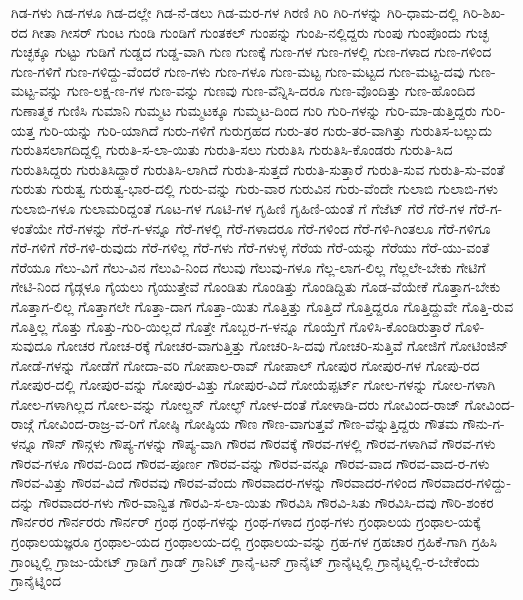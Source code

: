 {ಗಿಡ-ಗಳು
ಗಿಡ-ಗಳೂ
ಗಿಡ-ದಲ್ಲೇ
ಗಿಡ-ನೆ-ಡಲು
ಗಿಡ-ಮರ-ಗಳ
ಗಿರಣಿ
ಗಿರಿ
ಗಿರಿ-ಗಳನ್ನು
ಗಿರಿ-ಧಾಮ-ದಲ್ಲಿ
ಗಿರಿ-ಶಿಖ-ರದ
ಗೀತಾ
ಗೀಸರ್
ಗುಂಟ
ಗುಂಡಿ
ಗುಂಡಿಗೆ
ಗುಂತಕಲ್
ಗುಂಪನ್ನು
ಗುಂಪಿ-ನಲ್ಲಿದ್ದರು
ಗುಂಪು
ಗುಂಪೊಂದು
ಗುಚ್ಛ
ಗುಚ್ಛಕ್ಕೂ
ಗುಟ್ಟು
ಗುಡಿಗೆ
ಗುಡ್ಡದ
ಗುಡ್ಡ-ವಾಗಿ
ಗುಣ
ಗುಣಕ್ಕೆ
ಗುಣ-ಗಳ
ಗುಣ-ಗಳಲ್ಲಿ
ಗುಣ-ಗಳಾದ
ಗುಣ-ಗಳಿಂದ
ಗುಣ-ಗಳಿಗೆ
ಗುಣ-ಗಳಿದ್ದು-ವೆಂದರೆ
ಗುಣ-ಗಳು
ಗುಣ-ಗಳೂ
ಗುಣ-ಮಟ್ಟ
ಗುಣ-ಮಟ್ಟದ
ಗುಣ-ಮಟ್ಟ-ದವು
ಗುಣ-ಮಟ್ಟ-ವನ್ನು
ಗುಣ-ಲಕ್ಷ-ಣ-ಗಳ
ಗುಣ-ವನ್ನು
ಗುಣವು
ಗುಣ-ವೆನ್ನಿಸಿ-ದರೂ
ಗುಣ-ವೊಂದಿತ್ತು
ಗುಣ-ಹೊಂದಿದ
ಗುಣಾತ್ಮಕ
ಗುಣಿಸಿ
ಗುಮಾನಿ
ಗುಮ್ಮಟ
ಗುಮ್ಮಟಕ್ಕೂ
ಗುಮ್ಮಟ-ದಿಂದ
ಗುರಿ
ಗುರಿ-ಗಳನ್ನು
ಗುರಿ-ಮಾ-ಡುತ್ತಿದ್ದರು
ಗುರಿ-ಯತ್ತ
ಗುರಿ-ಯನ್ನು
ಗುರಿ-ಯಾಗಿದೆ
ಗುರು-ಗಳಿಗೆ
ಗುರುಗ್ರಹದ
ಗುರು-ತರ
ಗುರು-ತರ-ವಾಗಿತ್ತು
ಗುರುತಿಸ-ಬಲ್ಲುದು
ಗುರುತಿಸಲಾಗದಿದ್ದಲ್ಲಿ
ಗುರುತಿ-ಸ-ಲಾ-ಯಿತು
ಗುರುತಿ-ಸಲು
ಗುರುತಿಸಿ
ಗುರುತಿಸಿ-ಕೊಂಡರು
ಗುರುತಿ-ಸಿದ
ಗುರುತಿಸಿದ್ದರು
ಗುರುತಿಸಿದ್ದಾರೆ
ಗುರುತಿಸಿ-ಲಾಗಿದೆ
ಗುರುತಿ-ಸುತ್ತದೆ
ಗುರುತಿ-ಸುತ್ತಾರೆ
ಗುರುತಿ-ಸುವ
ಗುರುತಿ-ಸು-ವಂತೆ
ಗುರುತು
ಗುರುತ್ವ
ಗುರುತ್ವ-ಭಾರ-ದಲ್ಲಿ
ಗುರು-ವನ್ನು
ಗುರು-ವಾರ
ಗುರುವಿನ
ಗುರು-ವೆಂದೇ
ಗುಲಾಬಿ
ಗುಲಾಬಿ-ಗಳು
ಗುಲಾಬಿ-ಗಳೂ
ಗುಲಾಮರಿದ್ದಂತೆ
ಗೂಟ-ಗಳ
ಗೂಟಿ-ಗಳ
ಗೃಹಿಣಿ
ಗೃಹಿಣಿ-ಯಂತೆ
ಗೆ
ಗೆಜೆಟ್
ಗೆರೆ
ಗೆರೆ-ಗಳ
ಗೆರೆ-ಗ-ಳಂತೆಯೇ
ಗೆರೆ-ಗಳನ್ನು
ಗೆರೆ-ಗ-ಳನ್ನೂ
ಗೆರೆ-ಗಳಲ್ಲಿ
ಗೆರೆ-ಗಳಾದರೂ
ಗೆರೆ-ಗಳಿಂದ
ಗೆರೆ-ಗಳಿ-ಗಿಂತಲೂ
ಗೆರೆ-ಗಳಿಗೂ
ಗೆರೆ-ಗಳಿಗೆ
ಗೆರೆ-ಗಳಿ-ರುವುದು
ಗೆರೆ-ಗಳಿಲ್ಲ
ಗೆರೆ-ಗಳು
ಗೆರೆ-ಗಳುಳ್ಳ
ಗೆರೆಯ
ಗೆರೆ-ಯನ್ನು
ಗೆರೆಯು
ಗೆರೆ-ಯು-ವಂತೆ
ಗೆರೆಯೂ
ಗೆಲು-ವಿಗೆ
ಗೆಲು-ವಿನ
ಗೆಲುವಿ-ನಿಂದ
ಗೆಲುವು
ಗೆಲುವು-ಗಳೂ
ಗೆಲ್ಲ-ಲಾಗ-ಲಿಲ್ಲ
ಗೆಲ್ಲಲೇ-ಬೇಕು
ಗೇಟಿಗೆ
ಗೇಟಿ-ನಿಂದ
ಗೈಡ್ಗಳೂ
ಗೈಯಲು
ಗೈಯುತ್ತೇವೆ
ಗೊಂಡಿತು
ಗೊಂಡಿತ್ತು
ಗೊಂಡಿದ್ದಿತು
ಗೊಡ-ವೆಯೇಕೆ
ಗೊತ್ತಾಗ-ಬೇಕು
ಗೊತ್ತಾಗ-ಲಿಲ್ಲ
ಗೊತ್ತಾಗಲೇ
ಗೊತ್ತಾ-ದಾಗ
ಗೊತ್ತಾ-ಯಿತು
ಗೊತ್ತಿತ್ತು
ಗೊತ್ತಿದೆ
ಗೊತ್ತಿದ್ದರೂ
ಗೊತ್ತಿದ್ದುವೇ
ಗೊತ್ತಿ-ರುವ
ಗೊತ್ತಿಲ್ಲ
ಗೊತ್ತು
ಗೊತ್ತು-ಗುರಿ-ಯಿಲ್ಲದೆ
ಗೊತ್ತೇ
ಗೊಬ್ಬರ-ಗ-ಳನ್ನೂ
ಗೊಯ್ತೆಗೆ
ಗೊಳಿಸಿ-ಕೊಂಡಿರುತ್ತಾರೆ
ಗೊಳಿ-ಸುವುದೂ
ಗೋಚರ
ಗೋಚ-ರಕ್ಕೆ
ಗೋಚರ-ವಾಗುತ್ತಿತ್ತು
ಗೋಚರಿ-ಸಿ-ದವು
ಗೋಚರಿ-ಸುತ್ತಿವೆ
ಗೋಜಿಗೆ
ಗೋಟಿಂಜಿನ್
ಗೋಡೆ-ಗಳನ್ನು
ಗೋಡೆಗೆ
ಗೋದಾ-ವರಿ
ಗೋಪಾಲ-ರಾವ್
ಗೋಪಾಲ್
ಗೋಪುರ
ಗೋಪುರ-ಗಳ
ಗೋಪು-ರದ
ಗೋಪುರ-ದಲ್ಲಿ
ಗೋಪುರ-ವನ್ನು
ಗೋಪುರ-ವಿತ್ತು
ಗೋಪುರ-ವಿದೆ
ಗೋಯೆಪ್ಪರ್ಟ್
ಗೋಲ-ಗಳನ್ನು
ಗೋಲ-ಗಳಾಗಿ
ಗೋಲ-ಗಳಾಗಿಲ್ಲದ
ಗೋಲ-ವನ್ನು
ಗೋಲ್ಡನ್
ಗೋಲ್ಫ್
ಗೋಳ-ದಂತೆ
ಗೋಳಾಡಿ-ದರು
ಗೋವಿಂದ-ರಾಜ್
ಗೋವಿಂದ-ರಾಜ್ಗೆ
ಗೋವಿಂದ-ರಾಜ್ರ-ವ-ರಿಗೆ
ಗೋಷ್ಠಿ
ಗೋಷ್ಠಿಯ
ಗೌಣ
ಗೌಣ-ವಾಗುತ್ತವೆ
ಗೌಣ-ವೆನ್ನುತ್ತಿದ್ದರು
ಗೌತಮ
ಗೌನು-ಗ-ಳನ್ನೂ
ಗೌನ್
ಗೌನ್ಗಳು
ಗೌಪ್ಯ-ಗಳನ್ನು
ಗೌಪ್ಯ-ವಾಗಿ
ಗೌರವ
ಗೌರವಕ್ಕೆ
ಗೌರವ-ಗಳಲ್ಲಿ
ಗೌರವ-ಗಳಾಗಿವೆ
ಗೌರವ-ಗಳು
ಗೌರವ-ಗಳೂ
ಗೌರವ-ದಿಂದ
ಗೌರವ-ಪೂರ್ಣ
ಗೌರವ-ವನ್ನು
ಗೌರವ-ವನ್ನೂ
ಗೌರವ-ವಾದ
ಗೌರವ-ವಾದ-ರ-ಗಳು
ಗೌರವ-ವಿತ್ತು
ಗೌರವ-ವಿದೆ
ಗೌರವವು
ಗೌರವ-ವೆಂದು
ಗೌರವಾದರ-ಗಳನ್ನು
ಗೌರವಾದರ-ಗಳಿಂದ
ಗೌರವಾದರ-ಗಳಿದ್ದು-ದನ್ನು
ಗೌರವಾದರ-ಗಳು
ಗೌರ-ವಾನ್ವಿತ
ಗೌರವಿ-ಸ-ಲಾ-ಯಿತು
ಗೌರವಿಸಿ
ಗೌರವಿ-ಸಿತು
ಗೌರವಿಸಿ-ದವು
ಗೌರಿ-ಶಂಕರ
ಗೌರ್ನರರ
ಗೌರ್ನರರು
ಗೌರ್ನರ್
ಗ್ರಂಥ
ಗ್ರಂಥ-ಗಳನ್ನು
ಗ್ರಂಥ-ಗಳಾದ
ಗ್ರಂಥ-ಗಳು
ಗ್ರಂಥಾಲಯ
ಗ್ರಂಥಾಲ-ಯಕ್ಕೆ
ಗ್ರಂಥಾಲಯಜ್ಞರೂ
ಗ್ರಂಥಾಲ-ಯದ
ಗ್ರಂಥಾಲಯ-ದಲ್ಲಿ
ಗ್ರಂಥಾಲಯ-ವನ್ನು
ಗ್ರಹ-ಗಳ
ಗ್ರಹಚಾರ
ಗ್ರಹಿಕೆ-ಗಾಗಿ
ಗ್ರಹಿಸಿ
ಗ್ರಾಂಟ್ನಲ್ಲಿ
ಗ್ರಾಜು-ಯೇಟ್
ಗ್ರಾಡಿಗೆ
ಗ್ರಾಡ್
ಗ್ರಾನಿಟ್
ಗ್ರಾನೈ-ಟನ್
ಗ್ರಾನೈಟ್
ಗ್ರಾನೈಟ್ನಲ್ಲಿ
ಗ್ರಾನೈಟ್ನಲ್ಲಿ-ರ-ಬೇಕೆಂದು
ಗ್ರಾನೈಟ್ನಿಂದ
}
